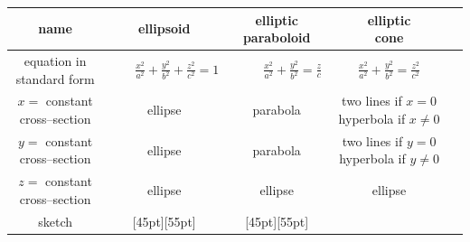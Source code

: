 \begin{tabular}{ | c | c | c | c | c |}
  \hline
  name & ellipsoid 
       & \parbox[c]{1.8cm}{\smallskip elliptic\\paraboloid}
       & \parbox[c]{1.5cm}{\smallskip elliptic\\cone}  \\[0.1in]
  \hline
  \parbox[c]{2.75cm}{\smallskip equation in\\standard form} 
       & \parbox[c]{3.4cm}{\ \ \ \ 
             $\frac{x^2}{a^2}+\frac{y^2}{b^2}+\frac{z^2}{c^2}=1$} 
       & \parbox[c]{3.4cm}{\ \ \ \ \ 
             $\frac{x^2}{a^2}+\frac{y^2}{b^2}=\frac{z}{c}$}
       & \parbox[c]{2.3cm}{
             $\frac{x^2}{a^2}+\frac{y^2}{b^2}=\frac{z^2}{c^2}$} \\[0.1in]
  \hline
  \parbox[c]{2.75cm}{\smallskip $x=$ constant \\cross--section} 
            & ellipse
            & parabola
            & \parbox[c]{3.5cm}{\smallskip two lines if $x=0$\\
                                           hyperbola if $x\ne 0$}   \\[0.1in]
  \hline
  \parbox[c]{2.75cm}{\smallskip $y=$ constant \\cross--section} 
            & ellipse
            & parabola
            & \parbox[c]{3.5cm}{\smallskip two lines if $y=0$\\
                                           hyperbola if $y\ne 0$} \\[0.1in]
  \hline
  \parbox[c]{2.75cm}{\smallskip $z=$ constant \\cross--section} 
            & ellipse
            & ellipse 
            & ellipse  \\[0.1in]
  \hline
  sketch 
     & \raisebox{-50pt}[45pt][55pt]
              {  }
     & \raisebox{-48pt}[45pt][55pt]
              {  }

\end{tabular}
